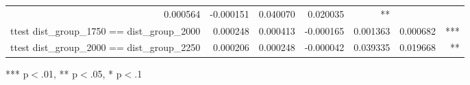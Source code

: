 \documentclass{article}
\begin{document}
\begin{table}[!h]
\begin{tabular}{lllllll}
  \multicolumn{1}{r}{0.000564} &
  \multicolumn{1}{r}{-0.000151} &
  \multicolumn{1}{r}{0.040070} &
  \multicolumn{1}{r}{0.020035} &
  \multicolumn{1}{r}{**} \\
\multicolumn{1}{l}{ttest dist\_group\_1750 == dist\_group\_2000} &
  \multicolumn{1}{|r}{0.000248} &
  \multicolumn{1}{r}{0.000413} &
  \multicolumn{1}{r}{-0.000165} &
  \multicolumn{1}{r}{0.001363} &
  \multicolumn{1}{r}{0.000682} &
  \multicolumn{1}{r}{***} \\
\multicolumn{1}{l}{ttest dist\_group\_2000 == dist\_group\_2250} &
  \multicolumn{1}{|r}{0.000206} &
  \multicolumn{1}{r}{0.000248} &
  \multicolumn{1}{r}{-0.000042} &
  \multicolumn{1}{r}{0.039335} &
  \multicolumn{1}{r}{0.019668} &
  \multicolumn{1}{r}{**} \\
\cline{1-7}
\end{tabular}

\footnotesize{
*** p$<$.01, ** p$<$.05, * p$<$.1
}
\end{table}
\end{document}
